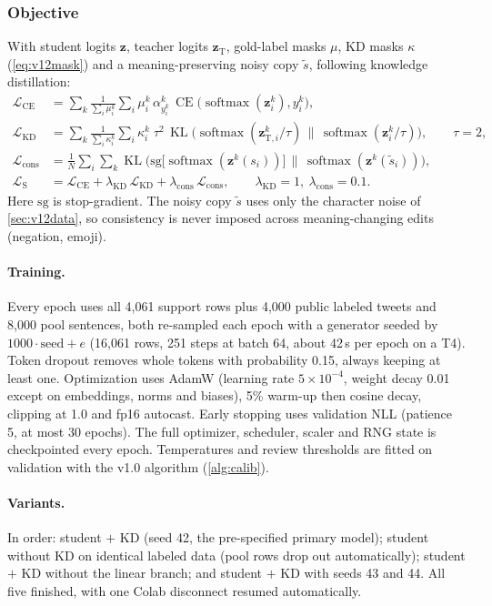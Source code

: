 \documentclass[11pt,a4paper]{article}
\theoremstyle{remark}
\newcommand{\z}{\bm{z}}
\DeclareMathOperator{\softmax}{softmax}
\DeclareMathOperator{\CE}{CE}
\DeclareMathOperator{\KL}{KL}
\begin{document}
\subsubsection{Objective}
With student logits $\z$, teacher logits $\z_{\text{T}}$, gold-label masks $\mu$, KD masks $\kappa$ (\cref{eq:v12mask}) and a meaning-preserving noisy copy $\tilde s$, following knowledge distillation:
\begin{align}
  \mathcal{L}_{\text{CE}} &= \sum_{k} \frac{1}{\sum_i\mu^k_i}\sum_i \mu^k_i\,\alpha^k_{y^k_i}\,\CE\big(\softmax(\z^k_i), y^k_i\big), \\
  \mathcal{L}_{\text{KD}} &= \sum_{k} \frac{1}{\sum_i\kappa^k_i}\sum_i \kappa^k_i\; \tau^2\,\KL\Big(\softmax(\z^k_{\text{T},i}/\tau)\,\Big\|\,\softmax(\z^k_i/\tau)\Big),\qquad \tau = 2, \\
  \mathcal{L}_{\text{cons}} &= \frac{1}{N}\sum_i\sum_k \KL\Big(\mathrm{sg}\big[\softmax(\z^k(s_i))\big]\,\Big\|\,\softmax(\z^k(\tilde s_i))\Big), \\
  \mathcal{L}_{\text{S}} &= \mathcal{L}_{\text{CE}} + \lambda_{\text{KD}}\,\mathcal{L}_{\text{KD}} + \lambda_{\text{cons}}\,\mathcal{L}_{\text{cons}},\qquad \lambda_{\text{KD}}=1,\ \lambda_{\text{cons}}=0.1.
  \label{eq:v12loss}
\end{align}
Here $\mathrm{sg}$ is stop-gradient. The noisy copy $\tilde s$ uses only the character noise of \cref{sec:v12data}, so consistency is never imposed across meaning-changing edits (negation, emoji).

\paragraph{Training.} Every epoch uses all 4{,}061 support rows plus 4{,}000 public labeled tweets and 8{,}000 pool sentences, both re-sampled each epoch with a generator seeded by $1000\cdot\text{seed}+e$ (16{,}061 rows, 251 steps at batch 64, about 42\,s per epoch on a T4). Token dropout removes whole tokens with probability 0.15, always keeping at least one. Optimization uses AdamW (learning rate $5\times10^{-4}$, weight decay 0.01 except on embeddings, norms and biases), 5\% warm-up then cosine decay, clipping at 1.0 and fp16 autocast. Early stopping uses validation NLL (patience 5, at most 30 epochs). The full optimizer, scheduler, scaler and RNG state is checkpointed every epoch. Temperatures and review thresholds are fitted on validation with the v1.0 algorithm (\cref{alg:calib}).

\paragraph{Variants.} In order: student $+$ KD (seed 42, the pre-specified primary model); student without KD on identical labeled data (pool rows drop out automatically); student $+$ KD without the linear branch; and student $+$ KD with seeds 43 and 44. All five finished, with one Colab disconnect resumed automatically.
\end{document}
